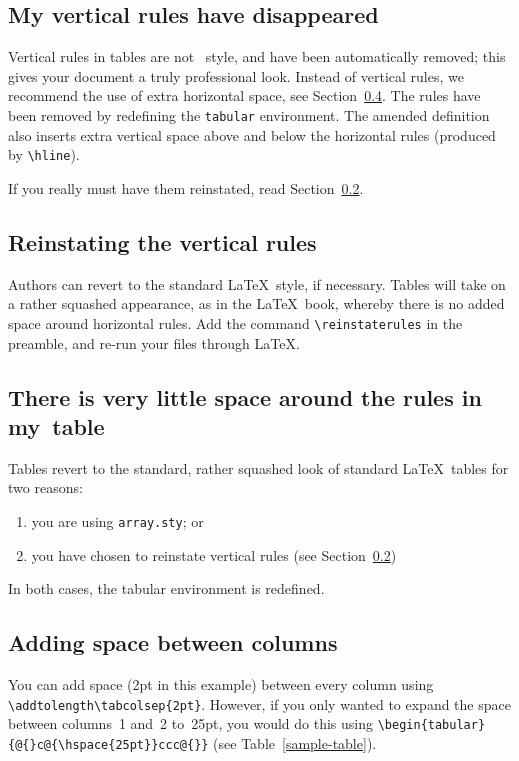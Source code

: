 \subsection{My vertical rules have disappeared}

Vertical rules in tables are not \cambridge\ style, and have been automatically removed; this gives your document a truly professional look. Instead of vertical rules, we recommend the use of extra horizontal space, see Section~\ref{addhoriz}. The rules have been removed by redefining the \verb"tabular" environment. The amended definition also inserts extra vertical space above and below the horizontal rules (produced by \verb"\hline").

If you really must have them reinstated, read Section~\ref{reinstate}.

\subsection{Reinstating the vertical rules}
\label{reinstate}
Authors can revert to the standard \LaTeX\ style, if necessary. Tables will take on a rather squashed appearance, as in the \LaTeX\ book, whereby there is no added space around horizontal rules. Add the command \verb"\reinstaterules" in the preamble, and re-run your files through \LaTeX.

\subsection{There is very little space around the rules in my~table}
Tables revert to the standard, rather squashed look of standard \LaTeX\ tables for two reasons:
\begin{enumerate}
  \item you are using \verb"array.sty"; or
  \item you have chosen to reinstate vertical rules (see Section~\ref{reinstate})
\end{enumerate}
In both cases, the tabular environment is redefined.


\subsection{Adding space between columns}
\label{addhoriz}
You can add space (2pt in this example) between every column using \verb"\addtolength\tabcolsep{2pt}". However, if you only wanted to expand the space between columns~1 and~2 to~25pt, you would do this using   \verb"\begin{tabular}{@{}c@{\hspace{25pt}}ccc@{}}" (see Table~\ref{sample-table}).

